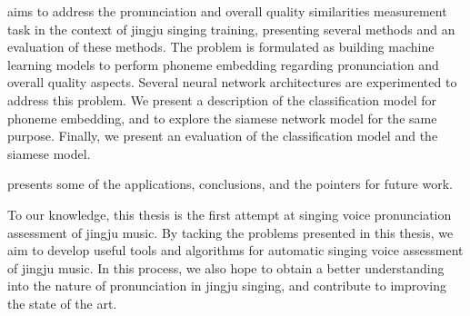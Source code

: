  aims to address the pronunciation and overall quality similarities measurement task in the context of jingju singing training, presenting several methods and an evaluation of these methods. The problem is formulated as building machine learning models to perform phoneme embedding regarding pronunciation and overall quality aspects. Several neural network architectures are experimented to address this problem. We present a description of the classification model for phoneme embedding, and to explore the siamese network model for the same purpose. Finally, we present an evaluation of the classification model and the siamese model.

 presents some of the applications, conclusions, and the pointers for future work.

To our knowledge, this thesis is the first attempt at singing voice pronunciation assessment of jingju music. By tacking the problems presented in this thesis, we aim to develop useful tools and algorithms for automatic singing voice assessment of jingju music. In this process, we also hope to obtain a better understanding into the nature of pronunciation in jingju singing, and contribute to improving the state of the art.


